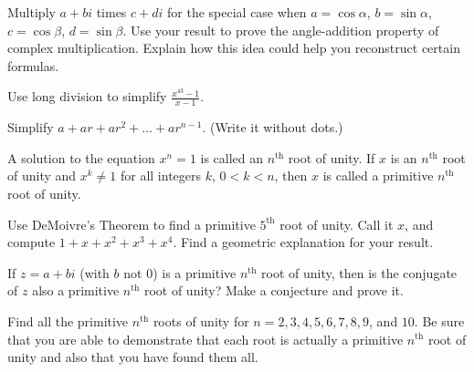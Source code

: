 \documentclass[space,nooutcomes]{ximera}
\begin{document}

\newpage 


\begin{problem}
Multiply $a + bi$ times $c + di$ for the special case when $a=\cos\alpha$, $b=\sin\alpha$, 
$c=\cos\beta$, $d=\sin\beta$.  Use your result to prove the angle-addition property of complex multiplication.  Explain how this idea could help you reconstruct certain formulas.  
\vfill 
\end{problem}

%
\begin{problem}
Use long division to simplify $\frac{x^{43}-1}{x-1}$.
\vfill 
\end{problem}

\begin{problem}
Simplify $a+ar+ar^2+\dots+ar^{n-1}$.  (Write it without dots.)
\vfill 
\end{problem}

\newpage 


A solution to the equation $x^n=1$ is called an $n^\text{th}$  root of unity.  If $x$ is an $n^\text{th}$ root of unity and $x^k\ne 1$ for all integers $k$, $0<k<n$, then $x$ is called a primitive $n^\text{th}$ root of unity.  

\begin{problem}
Use DeMoivre's Theorem to find a primitive $5^\text{th}$ root of unity.  Call it $x$, and compute $1+x+x^2+x^3+x^4$. Find a geometric explanation for your result.  
\vfill 
\end{problem}

\begin{problem}
If $z = a + bi$ (with $b$ not $0$) is a primitive $n^\text{th}$ root of unity, then is the conjugate of $z$ also a primitive $n^\text{th}$ root of unity?  Make a conjecture and prove it.
\vfill 
\end{problem}

\begin{problem}
Find all the primitive $n^\text{th}$ roots of unity for $n = 2, 3, 4, 5, 6, 7, 8, 9$, and $10$.  Be sure that you are able to demonstrate that each root is actually a primitive $n^\text{th}$ root of unity and also that you have found them all.  
\vfill 
\end{problem}
\end{document}
